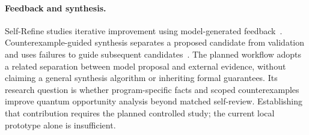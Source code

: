 \paragraph{Feedback and synthesis.}
Self-Refine studies iterative improvement using model-generated
feedback~\cite{selfrefine}. Counterexample-guided synthesis separates a proposed
candidate from validation and uses failures to guide subsequent
candidates~\cite{sketching}. The planned workflow adopts a related separation
between model proposal and external evidence, without claiming a general synthesis
algorithm or inheriting formal guarantees. Its research question is whether
program-specific facts and scoped counterexamples improve quantum opportunity
analysis beyond matched self-review. Establishing that contribution requires
the planned controlled study; the current local prototype alone is insufficient.
